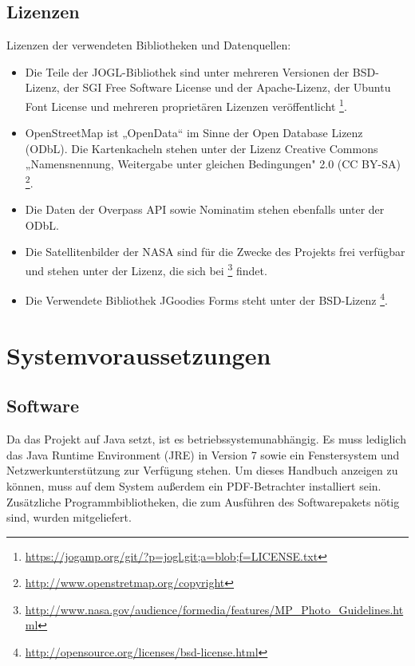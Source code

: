 \documentclass[10pt]{scrreprt}
\begin{document}
\vspace{3mm}
\section{Lizenzen}   
Lizenzen der verwendeten Bibliotheken und Datenquellen:
\begin{itemize}
\item Die Teile der JOGL-Bibliothek  sind unter mehreren Versionen der BSD-Lizenz, der SGI Free Software License und der Apache-Lizenz, der Ubuntu Font License und mehreren proprietären Lizenzen veröffentlicht  \footnote{\url{https://jogamp.org/git/?p=jogl.git;a=blob;f=LICENSE.txt}}.
\item OpenStreetMap ist „OpenData“ im Sinne der Open Database Lizenz (ODbL). Die Kartenkacheln stehen unter der Lizenz  Creative Commons „Namensnennung, Weitergabe unter gleichen Bedingungen" 2.0 (CC BY-SA) \footnote{\url{http://www.openstretmap.org/copyright}}.
\item Die Daten der Overpass API sowie Nominatim stehen ebenfalls unter der ODbL.  
\item Die Satellitenbilder der NASA sind für die Zwecke des Projekts frei verfügbar und stehen unter der Lizenz, die sich bei \footnote{\url{http://www.nasa.gov/audience/formedia/features/MP_Photo_Guidelines.html}} findet.
\item Die Verwendete Bibliothek JGoodies Forms steht unter der BSD-Lizenz \footnote{\url{http://opensource.org/licenses/bsd-license.html}}.
\end{itemize}




\chapter{Systemvoraussetzungen} 
\section{Software}
Da das Projekt auf Java  setzt, ist es betriebssystemunabhängig. Es muss lediglich das Java Runtime Environment (JRE) in Version 7 sowie ein Fenstersystem und Netzwerkunterstützung zur Verfügung stehen. Um dieses Handbuch anzeigen zu können, muss auf dem System außerdem ein PDF-Betrachter installiert sein. Zusätzliche Programmbibliotheken, die zum Ausführen des Softwarepakets nötig sind, wurden mitgeliefert.\\
\end{document}
